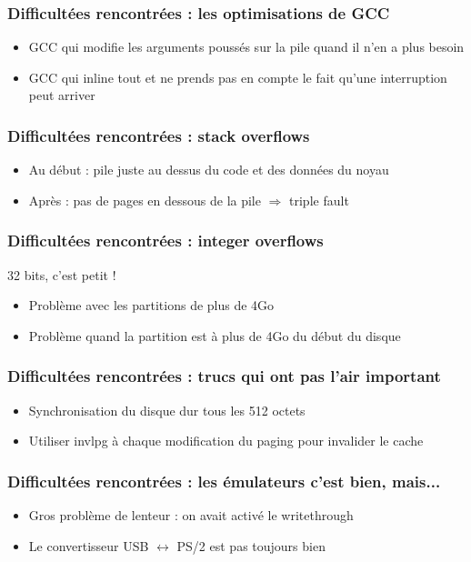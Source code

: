 \documentclass[aspectration=43]{beamer}
\begin{document}
\begin{frame}
    \frametitle{Difficultées rencontrées : les optimisations de GCC}
    \begin{itemize}
        \item GCC qui modifie les arguments poussés sur la pile quand il n'en a plus besoin
        \item GCC qui inline tout et ne prends pas en compte le fait qu'une interruption peut arriver
    \end{itemize}
\end{frame}

\begin{frame}
    \frametitle{Difficultées rencontrées : stack overflows}
    \begin{itemize}
        \item Au début : pile juste au dessus du code et des données du noyau
        \item Après : pas de pages en dessous de la pile $\Rightarrow$ triple fault
    \end{itemize}
\end{frame}

\begin{frame}
    \frametitle{Difficultées rencontrées : integer overflows}
    32 bits, c'est petit !
    \begin{itemize}
        \item Problème avec les partitions de plus de 4Go
        \item Problème quand la partition est à plus de 4Go du début du disque
    \end{itemize}
\end{frame}

\begin{frame}
    \frametitle{Difficultées rencontrées : trucs qui ont pas l'air important}
    \begin{itemize}
        \item Synchronisation du disque dur tous les 512 octets
        \item Utiliser invlpg à chaque modification du paging pour invalider le cache
    \end{itemize}
\end{frame}

\begin{frame}
    \frametitle{Difficultées rencontrées : les émulateurs c'est bien, mais...}
    \begin{itemize}
        \item Gros problème de lenteur : on avait activé le writethrough
        \item Le convertisseur USB $\leftrightarrow$ PS/2 est pas toujours bien
    \end{itemize}
\end{frame}
\end{document}
